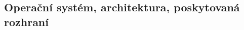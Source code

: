 \documentclass[10pt,a4paper]{article}
\begin{document}
\subsection{Operační systém, architektura, poskytovaná rozhraní}

\end{document}

